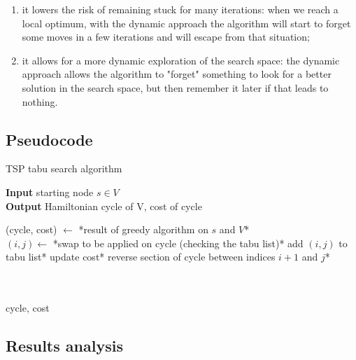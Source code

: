 \begin{enumerate}
    \item it lowers the risk of remaining stuck for many iterations: when we reach a local optimum, with the dynamic approach the algorithm will start to forget some moves in a few iterations and will escape from that situation;
    \item it allows for a more dynamic exploration of the search space: the dynamic approach allows the algorithm to "forget" something to look for a better solution in the search space, but then remember it later if that leads to nothing.
\end{enumerate}

\subsection{Pseudocode}

\begin{algorithm}
    \caption{TSP tabu search algorithm}
    
    \textbf{Input} starting node $s\in V$\\
    \textbf{Output} Hamiltonian cycle of V, cost of cycle\\
    \begin{algorithmic}
        
        \State (cycle, cost) $\gets$ *result of greedy algorithm on $s$ and $V$*\\

            \State $(i, j)\gets$ *swap to be applied on cycle (checking the tabu list)*
                \State *add $(i,j)$ to tabu list*
            \EndIf
            \State *update cost*
            \State *reverse section of cycle between indices $i+1$ and $j$*

        \EndWhile\\\\

        \Return cycle, cost
    \end{algorithmic}
\end{algorithm}

\subsection{Results analysis}

